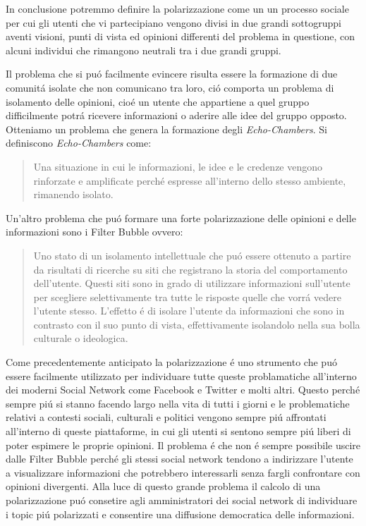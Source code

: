 In conclusione potremmo definire la polarizzazione come un un processo sociale per cui gli utenti che vi partecipiano vengono divisi in due grandi sottogruppi aventi visioni, punti di vista ed opinioni differenti del problema in questione, con alcuni individui che rimangono neutrali tra i due grandi gruppi.

Il problema che si pu\'o facilmente evincere risulta essere la formazione di due comunit\'a isolate che non comunicano tra loro, ci\'o comporta un problema di isolamento delle opinioni, cio\'e un utente che appartiene a quel gruppo difficilmente potr\'a ricevere informazioni o aderire alle idee del gruppo opposto.
Otteniamo un problema che genera la formazione degli \textit{Echo-Chambers}. Si definiscono \textit{Echo-Chambers} come:
\begin{quote} 
Una situazione in cui le informazioni, le idee e le credenze vengono rinforzate e amplificate perch\'e espresse all'interno dello stesso ambiente, rimanendo isolato.
\end{quote}

Un'altro problema che pu\'o formare una forte polarizzazione delle opinioni e delle informazioni sono i Filter Bubble ovvero:

\begin{quote} 
Uno stato di un isolamento intellettuale che pu\'o essere ottenuto a partire da risultati di ricerche su siti che registrano la storia del comportamento dell'utente. Questi siti sono in grado di utilizzare informazioni sull'utente per scegliere selettivamente tra tutte le risposte quelle che vorr\'a vedere l'utente stesso. L'effetto \'e di isolare l'utente da informazioni che sono in contrasto con il suo punto di vista, effettivamente isolandolo nella sua bolla culturale o ideologica.
\end{quote}

Come precedentemente anticipato la polarizzazione \'e uno strumento che pu\'o essere facilmente utilizzato per individuare tutte queste problamatiche all'interno dei moderni Social Network come Facebook e Twitter e molti altri. Questo perch\'e sempre pi\'u si stanno facendo largo nella vita di tutti i giorni e le problematiche relativi a contesti sociali, culturali e politici vengono sempre pi\'u affrontati all'interno di queste piattaforme, in cui gli utenti si sentono sempre pi\'u liberi di poter espimere le proprie opinioni.
Il problema \'e che non \'e sempre possibile uscire dalle Filter Bubble perch\'e gli stessi social network tendono a indirizzare l'utente a visualizzare informazioni che potrebbero interessarli senza fargli confrontare con opinioni divergenti. 
Alla luce di questo grande problema il calcolo di una polarizzazione pu\'o consetire agli amministratori dei social network di individuare i topic pi\'u polarizzati e consentire una diffusione democratica delle informazioni.

